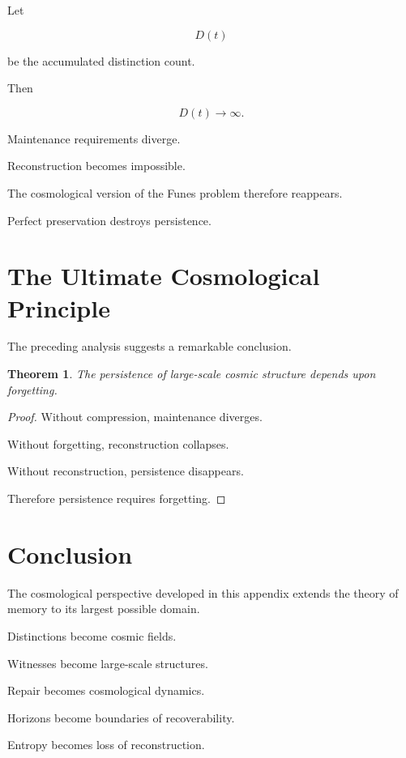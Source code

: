 \documentclass[12pt,oneside]{book}
\theoremstyle{plain} \newtheorem{theorem}{Theorem}[chapter] \newtheorem{lemma}[theorem]{Lemma} \newtheorem{proposition}[theorem]{Proposition} \newtheorem{corollary}[theorem]{Corollary}
\theoremstyle{definition} \newtheorem{definition}[theorem]{Definition} \newtheorem{axiom}[theorem]{Axiom} \newtheorem{construction}[theorem]{Construction}
\theoremstyle{remark} \newtheorem{remark}[theorem]{Remark} \newtheorem{example}[theorem]{Example}
\begin{document}
Let

\[
D(t)
\]

be the accumulated distinction count.

Then

\[
D(t)
\rightarrow
\infty.
\]

Maintenance requirements diverge.

Reconstruction becomes impossible.

The cosmological version of the Funes problem therefore reappears.

Perfect preservation destroys persistence.

\section{The Ultimate Cosmological Principle}

The preceding analysis suggests a remarkable conclusion.

\begin{theorem}

The persistence of large-scale cosmic structure depends upon forgetting.

\end{theorem}

\begin{proof}

Without compression, maintenance diverges.

Without forgetting, reconstruction collapses.

Without reconstruction, persistence disappears.

Therefore persistence requires forgetting.

\end{proof}

\section{Conclusion}

The cosmological perspective developed in this appendix extends the theory of memory to its largest possible domain.

Distinctions become cosmic fields.

Witnesses become large-scale structures.

Repair becomes cosmological dynamics.

Horizons become boundaries of recoverability.

Entropy becomes loss of reconstruction.
\end{document}
